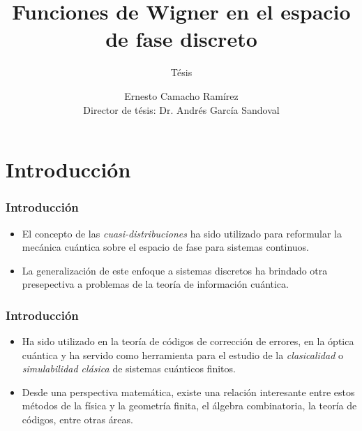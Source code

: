 \documentclass[10pt,spanish]{beamer}
\title{Funciones de Wigner en el espacio de fase discreto}
\subtitle{Tésis}
\author{
  Ernesto Camacho Ramírez\texorpdfstring{\\}
  {}Director de tésis: Dr. Andrés García Sandoval
}
\institute{Centro Universitario de Ciencias Exactas e
Ingenierías \and Universidad de Guadalajara}
\begin{document}
  \maketitle

  \section{Introducción}

  \begin{frame}
    \frametitle{Introducción}

    \begin{itemize}
      \item El concepto de las \textit{cuasi-distribuciones}
        ha sido utilizado para reformular la mecánica
        cuántica sobre el espacio de fase para sistemas
        continuos.
      \pause
      \vspace{5mm}
      \item La generalización de este enfoque a sistemas
        discretos ha brindado otra presepectiva a problemas
        de la teoría de información cuántica.
    \end{itemize}
  \end{frame}

  \begin{frame}
    \frametitle{Introducción}

    \begin{itemize}
      \item Ha sido utilizado en la teoría de códigos de
        corrección de errores, en la óptica cuántica y ha
        servido como herramienta para el estudio de la
        \textit{clasicalidad} o \textit{simulabilidad
        clásica} de sistemas cuánticos finitos.
      \pause
      \vspace{5mm}
      \item Desde una perspectiva matemática, existe una
        relación interesante entre estos métodos de la
        física y la geometría finita, el álgebra
        combinatoria, la teoría de códigos, entre otras
        áreas.
    \end{itemize}
  \end{frame}
\end{document}
